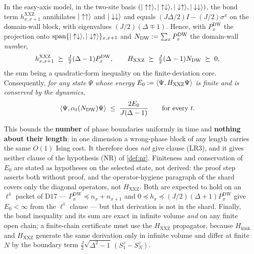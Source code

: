 \begin{theorem}
\label{thm:edw}
\statusProved\;
In the easy-axis model, in the two-site basis
$(|\uparrow\uparrow\rangle,|\uparrow\downarrow\rangle,
|\downarrow\uparrow\rangle,|\downarrow\downarrow\rangle)$, the bond term
$h^{\mathrm{XXZ}}_{x,x+1}$ annihilates $|\uparrow\uparrow\rangle$ and
$|\downarrow\downarrow\rangle$ and equals $(J\Delta/2)I-(J/2)\sigma^x$ on the
domain-wall block, with eigenvalues $(J/2)(\Delta\mp1)$. Hence, with
$P^{\mathrm{DW}}_x$ the projection onto
$\mathrm{span}\{|\uparrow\downarrow\rangle,|\downarrow\uparrow\rangle\}_{x,x+1}$
and $N_{\mathrm{DW}}:=\sum_xP^{\mathrm{DW}}_x$ the domain-wall \emph{number},
\begin{equation}
  h^{\mathrm{XXZ}}_{x,x+1}\;\succeq\;\tfrac{J}{2}(\Delta-1)P^{\mathrm{DW}}_x,
  \qquad
  H_{\mathrm{XXZ}}\;\succeq\;\tfrac{J}{2}(\Delta-1)N_{\mathrm{DW}}\;\succeq\;0,
  \label{eq:edw-operator}
\end{equation}
the sum being a quadratic-form inequality on the finite-deviation core.
Consequently, \emph{for any state $\Psi$ whose energy
$E_0:=\langle \Psi,H_{\mathrm{XXZ}}\Psi\rangle$ is finite and is conserved by the
dynamics},
\begin{equation}
  \langle \Psi,\alpha_t(N_{\mathrm{DW}})\Psi\rangle\;\le\;\frac{2E_0}{J(\Delta-1)}
  \qquad\text{for every }t .
  \label{eq:edw-bound}
\end{equation}
\end{theorem}

\begin{scope}
\label{scope:edw}
This bounds the \textbf{number} of phase boundaries uniformly in time and
\textbf{nothing about their length}: in one dimension a wrong-phase block of
any length carries the same $O(1)$ Ising cost. It therefore does \emph{not}
give clause (LR3), and it gives neither clause of the hypothesis (NR) of
\cref{def:nr}. Finiteness and conservation of $E_0$ are stated as hypotheses
on the selected state, not derived: the proof step asserts both without proof,
and the operator-hygiene paragraph of the shard covers only the diagonal
operators, not $H_{\mathrm{XXZ}}$. Both are expected to hold on an $\ell^1$
packet of D17 --- $P^{\mathrm{DW}}_x\preceq n_x+n_{x+1}$ and
$0\preceq h_x\preceq(J/2)(\Delta+1)P^{\mathrm{DW}}_x$ give $E_0<\infty$ from
the $\ell^1$ clause --- but that derivation is not in the shard. Finally, the
bond inequality and its sum are exact in infinite volume \emph{and} on any
finite open chain; a finite-chain certificate must use the
$H_{\mathrm{XXZ}}$ propagator, because $H_{\mathrm{kink}}$ and
$H_{\mathrm{XXZ}}$ generate the same derivation only in infinite volume and
differ at finite $N$ by the boundary term
$\tfrac{J}{2}\sqrt{\Delta^2-1}\,(S^z_1-S^z_N)$.
\end{scope}

